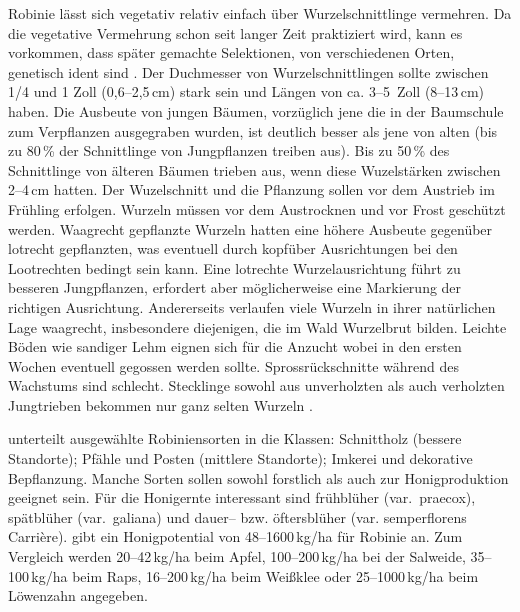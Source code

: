 \documentclass[twocolumn]{scrartcl}
\begin{document}
Robinie lässt sich vegetativ relativ einfach über Wurzelschnittlinge
vermehren. Da die vegetative Vermehrung schon seit langer Zeit
praktiziert wird, kann es vorkommen, dass später gemachte Selektionen,
von verschiedenen Orten, genetisch ident sind
\citep{liesebach2012robinie}. Der Duchmesser von Wurzelschnittlingen sollte zwischen 1/4
und 1 Zoll (0,6--2,5\,cm) stark sein und Längen von ca. 3--5~Zoll
(8--13\,cm) haben. Die Ausbeute von jungen Bäumen, vorzüglich jene die
in der Baumschule zum Verpflanzen ausgegraben wurden, ist deutlich
besser als jene von alten (bis zu 80\,\% der Schnittlinge von Jungpflanzen treiben aus).
Bis zu 50\,\% des Schnittlinge von älteren Bäumen trieben aus, wenn diese
Wuzelstärken zwischen 2--4\,cm hatten.
Der Wuzelschnitt und die Pflanzung sollen vor dem
Austrieb im Frühling erfolgen. Wurzeln müssen vor dem Austrocknen und
vor Frost geschützt werden. Waagrecht gepflanzte Wurzeln hatten eine
höhere Ausbeute gegenüber lotrecht gepflanzten, was eventuell durch
kopfüber Ausrichtungen bei den Lootrechten bedingt sein kann. Eine
lotrechte Wurzelausrichtung führt zu besseren Jungpflanzen, erfordert
aber möglicherweise eine Markierung der richtigen
Ausrichtung. Andererseits verlaufen viele Wurzeln in ihrer natürlichen
Lage waagrecht, insbesondere diejenigen, die im Wald Wurzelbrut bilden.
Leichte Böden wie sandiger Lehm
eignen sich für die Anzucht wobei in den ersten Wochen eventuell
gegossen werden sollte. Sprossrückschnitte während des Wachstums sind
schlecht. Stecklinge sowohl aus unverholzten als auch verholzten
Jungtrieben bekommen nur ganz selten Wurzeln
\citep{swingle1937robinie}.

\cite{keresztesi1983robinie} unterteilt ausgewählte Robiniensorten in
die Klassen: Schnittholz (bessere Standorte); Pfähle und Posten
(mittlere Standorte); Imkerei und dekorative Bepflanzung. Manche
Sorten sollen sowohl forstlich als auch zur Honigproduktion geeignet
sein. Für die Honigernte interessant sind frühblüher (var.\ praecox),
spätblüher (var.\ galiana) und dauer-- bzw. öftersblüher
(var. semperflorens Carrière). \cite[S.~80]{crane1985honig} gibt ein
Honigpotential von 48--1600\,kg/ha für Robinie an. Zum Vergleich werden
20--42\,kg/ha beim Apfel, 100--200\,kg/ha bei der Salweide,
35--100\,kg/ha beim Raps, 16--200\,kg/ha beim Weißklee oder
25--1000\,kg/ha beim Löwenzahn angegeben.
\end{document}
